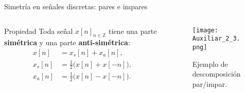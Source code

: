 \documentclass[
    10pt,
    aspectratio=169,
    xcolor={dvipsnames},
    spanish,
    ]{beamer}
\begin{document}
\begin{frame}{Simetría en señales discretas: pares e impares}
\begin{columns}[T,onlytextwidth]
  \begin{column}{0.55\textwidth}
    \begin{block}{Propiedad}
    Toda señal $x[n]_{n \in \mathbb{Z}}$ tiene una parte \textbf{simétrica} y una parte \textbf{anti-simétrica}:
    \begin{align*}
      x[n] &= x_s[n] + x_a[n], \\
      x_s[n] &= \tfrac{1}{2}\big(x[n] + x[-n]\big), \\
      x_a[n] &= \tfrac{1}{2}\big(x[n] - x[-n]\big).
    \end{align*}
    \end{block}
  \end{column}
  \begin{column}{0.4\textwidth}
    \begin{figure}
      \centering
      \texttt{[image: Auxiliar\_2\_3.png]}
      \caption{\scriptsize Ejemplo de descomposición par/impar.}
    \end{figure}
  \end{column}
\end{columns}
\end{frame}
\end{document}
